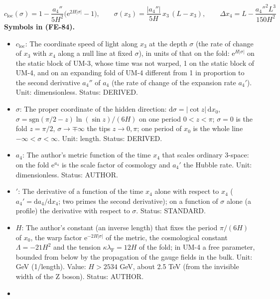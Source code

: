 \documentclass[
  10pt,
]{article}
\providecommand{\tightlist}{%
  \setlength{\itemsep}{0pt}\setlength{\parskip}{0pt}}
\begin{document}
\[
c_{\mathrm{loc}}(\sigma) = 1 - \frac{a_4''}{5H^2}\big(\mathrm{e}^{2H\lvert\sigma\rvert} - 1\big),\qquad
\sigma(x_3) = \frac{\lvert a_4''\rvert}{5H}\,x_3\,(L - x_3),\qquad
\Delta x_4 = L - \frac{a_4''^2L^3}{150H^2} \tag{FE-84}
\] \textbf{Symbols in (FE-84).}

\begin{itemize}
\tightlist
\item
  \(c_{\mathrm{loc}}\): The coordinate speed of light along \(x_3\) at
  the depth \(\sigma\) (the rate of change of \(x_3\) with \(x_4\) along
  a null line at fixed \(\sigma\)), in units of that on the fold:
  \(\mathrm{e}^{H\lvert\sigma\rvert}\) on the static block of UM-3,
  whose time was not warped, 1 on the static block of UM-4, and on an
  expanding fold of UM-4 different from 1 in proportion to the second
  derivative \(a_4''\) of \(a_4\) (the rate of change of the expansion
  rate \(a_4'\)). Unit: dimensionless. Status: DERIVED.
\item
  \(\sigma\): The proper coordinate of the hidden direction:
  \(\mathrm{d}\sigma = \lvert\cot z\rvert\,\mathrm{d}x_0\),
  \(\sigma = \mathrm{sgn}(\pi/2 - z)\ln(\sin z)/(6H)\) on one period
  \(0 < z < \pi\); \(\sigma = 0\) is the fold \(z = \pi/2\),
  \(\sigma \to \mp\infty\) the tips \(z \to 0, \pi\); one period of
  \(x_0\) is the whole line \(-\infty < \sigma < \infty\). Unit: length.
  Status: DERIVED.
\item
  \(a_4\): The author's metric function of the time \(x_4\) that scales
  ordinary 3-space: on the fold \(\mathrm{e}^{a_4}\) is the scale factor
  of cosmology and \(a_4'\) the Hubble rate. Unit: dimensionless.
  Status: AUTHOR.
\item
  \({}'\): The derivative of a function of the time \(x_4\) alone with
  respect to \(x_4\) (\(a_4' = \mathrm{d}a_4/\mathrm{d}x_4\); two primes
  the second derivative); on a function of \(\sigma\) alone (a profile)
  the derivative with respect to \(\sigma\). Status: STANDARD.
\item
  \(H\): The author's constant (an inverse length) that fixes the period
  \(\pi/(6H)\) of \(x_0\), the warp factor
  \(\mathrm{e}^{-2H\lvert\sigma\rvert}\) of the metric, the cosmological
  constant \(\Lambda = -21H^2\) and the tension
  \(\kappa\lambda_{\mathrm{F}} = 12H\) of the fold; in UM-4 a free
  parameter, bounded from below by the propagation of the gauge fields
  in the bulk. Unit: GeV (1/length). Value: \(H > 2534\) GeV, about 2.5
  TeV (from the invisible width of the Z boson). Status: AUTHOR.
\item

\end{itemize}
\end{document}
